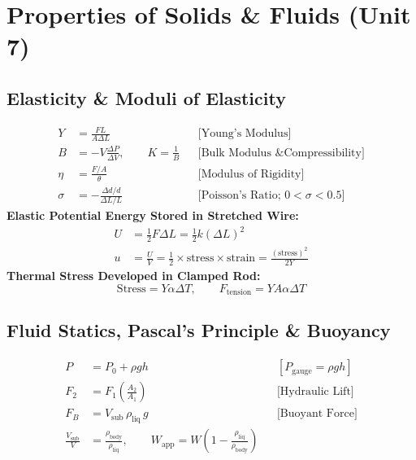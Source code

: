 \documentclass[10pt,twoside,openright]{book}
\begin{document}
\section{Properties of Solids \& Fluids (Unit 7)}

\subsection{Elasticity \& Moduli of Elasticity}

\begin{formulabox}
\begin{align}
  Y &= \frac{F L}{A \Delta L} && \text{[Young's Modulus]} \\
  B &= -V\frac{\Delta P}{\Delta V}, \qquad K = \frac{1}{B} && \text{[Bulk Modulus \& Compressibility]} \\
  \eta &= \frac{F/A}{\theta} && \text{[Modulus of Rigidity]} \\
  \sigma &= -\frac{\Delta d / d}{\Delta L / L} && \text{[Poisson's Ratio; } 0 < \sigma < 0.5\text{]}
\end{align}
\textbf{Elastic Potential Energy Stored in Stretched Wire:}
\begin{align}
  U &= \frac{1}{2} F \Delta L = \frac{1}{2} k (\Delta L)^2 \\
  u &= \frac{U}{V} = \frac{1}{2}\times\text{stress}\times\text{strain} = \frac{(\text{stress})^2}{2Y}
\end{align}
\textbf{Thermal Stress Developed in Clamped Rod:}
\begin{equation}
  \text{Stress} = Y\alpha\Delta T, \qquad F_{\text{tension}} = Y A \alpha \Delta T
\end{equation}
\end{formulabox}

\subsection{Fluid Statics, Pascal's Principle \& Buoyancy}

\begin{formulabox}
\begin{align}
  P &= P_0 + \rho g h && [P_{\text{gauge}} = \rho g h] \\
  F_2 &= F_1\left(\frac{A_2}{A_1}\right) && \text{[Hydraulic Lift]} \\
  F_B &= V_{\text{sub}}\,\rho_{\text{liq}}\,g && \text{[Buoyant Force]} \\
  \frac{V_{\text{sub}}}{V} &= \frac{\rho_{\text{body}}}{\rho_{\text{liq}}}, \qquad W_{\text{app}} = W\left(1 - \frac{\rho_{\text{liq}}}{\rho_{\text{body}}}\right)
\end{align}
\end{formulabox}
\end{document}
